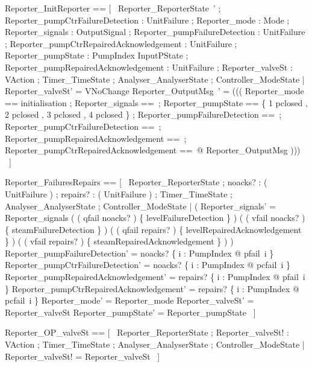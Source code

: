 \documentclass{article}
\begin{document}
\begin{zed}
    Reporter\_InitReporter == [~  Reporter\_ReporterState~' ; Reporter\_pumpCtrFailureDetection : \power UnitFailure ; Reporter\_mode : Mode ; Reporter\_signals : \power OutputSignal ; Reporter\_pumpFailureDetection : \power UnitFailure ; Reporter\_pumpCtrRepairedAcknowledgement : \power UnitFailure ; Reporter\_pumpState : PumpIndex \fun InputPState ; Reporter\_pumpRepairedAcknowledgement : \power UnitFailure ; Reporter\_valveSt : VAction ; \Xi Timer\_TimeState ; \Xi Analyser\_AnalyserState ; \Xi Controller\_ModeState | Reporter\_valveSt' = VNoChange \land \theta Reporter\_OutputMsg~' = ((( \LET Reporter\_mode == initialisation ; Reporter\_signals ==~\emptyset[OutputSignal] ; Reporter\_pumpState == \{ 1 \mapsto pclosed , 2 \mapsto pclosed , 3 \mapsto pclosed , 4 \mapsto pclosed \} ; Reporter\_pumpFailureDetection ==~\emptyset[UnitFailure] ; Reporter\_pumpCtrFailureDetection ==~\emptyset[UnitFailure] ; Reporter\_pumpRepairedAcknowledgement ==~\emptyset[UnitFailure] ; Reporter\_pumpCtrRepairedAcknowledgement ==~\emptyset[UnitFailure] @ \theta Reporter\_OutputMsg )))  ~]
\end{zed}

\begin{zed}
	Reporter\_FailuresRepairs == [~  \Delta Reporter\_ReporterState ; noacks? : ( \power UnitFailure ) ; repairs? : ( \power UnitFailure ) ; \Xi Timer\_TimeState ; \Xi Analyser\_AnalyserState ; \Xi Controller\_ModeState | ( Reporter\_signals' = Reporter\_signals \cup ( \IF ( qfail \in noacks? ) \THEN \{ levelFailureDetection \} \ELSE \emptyset ) \cup ( \IF ( vfail \in noacks? ) \THEN \{ steamFailureDetection \} \ELSE \emptyset ) \cup ( \IF ( qfail \in repairs? ) \THEN \{ levelRepairedAcknowledgement \} \ELSE \emptyset ) \cup ( \IF ( vfail \in repairs? ) \THEN \{ steamRepairedAcknowledgement \} \ELSE \emptyset ) ) \land Reporter\_pumpFailureDetection' = noacks? \cap \{ i : PumpIndex @ pfail~i \} \land Reporter\_pumpCtrFailureDetection' = noacks? \cap \{ i : PumpIndex @ pcfail~i \} \land Reporter\_pumpRepairedAcknowledgement' = repairs? \cap \{ i : PumpIndex @ pfail~i \} \land Reporter\_pumpCtrRepairedAcknowledgement' = repairs? \cap \{ i : PumpIndex @ pcfail~i \} \land Reporter\_mode' = Reporter\_mode \land Reporter\_valveSt' = Reporter\_valveSt \land Reporter\_pumpState' = Reporter\_pumpState  ~]
\end{zed}

\begin{zed}
	Reporter\_OP\_valveSt == [~  \Xi Reporter\_ReporterState ; Reporter\_valveSt! : VAction ; \Xi Timer\_TimeState ; \Xi Analyser\_AnalyserState ; \Xi Controller\_ModeState | Reporter\_valveSt! = Reporter\_valveSt  ~]
\end{zed}
\end{document}
